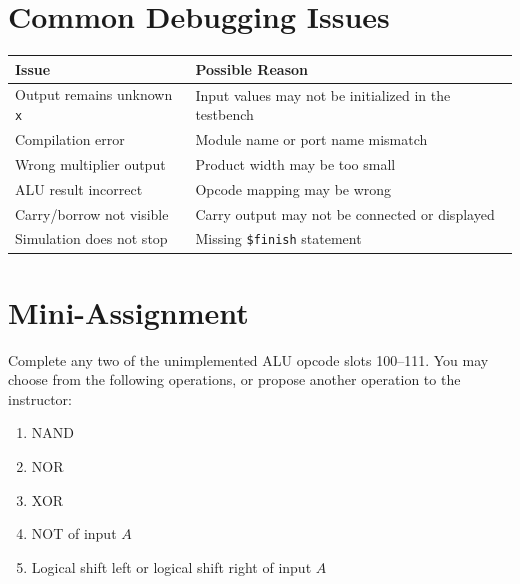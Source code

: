 \documentclass[11pt,a4paper]{article}
\begin{document}
\section{Common Debugging Issues}

\begin{center}
\renewcommand{\arraystretch}{1.25}
\begin{tabular}{p{4.3cm}p{8.5cm}}
\toprule
\textbf{Issue} & \textbf{Possible Reason} \\
\midrule
Output remains unknown \texttt{x} & Input values may not be initialized in the testbench \\
Compilation error & Module name or port name mismatch \\
Wrong multiplier output & Product width may be too small \\
ALU result incorrect & Opcode mapping may be wrong \\
Carry/borrow not visible & Carry output may not be connected or displayed \\
Simulation does not stop & Missing \texttt{\$finish} statement \\
\bottomrule
\end{tabular}
\end{center}

\section{Mini-Assignment}

\begin{exercisebox}
Complete any two of the unimplemented ALU opcode slots 100--111. You may choose from the following operations, or propose another operation to the instructor:

\begin{enumerate}[leftmargin=*]
    \item NAND
    \item NOR
    \item XOR
    \item NOT of input $A$
    \item Logical shift left or logical shift right of input $A$
\end{enumerate}
\end{exercisebox}
\end{document}
